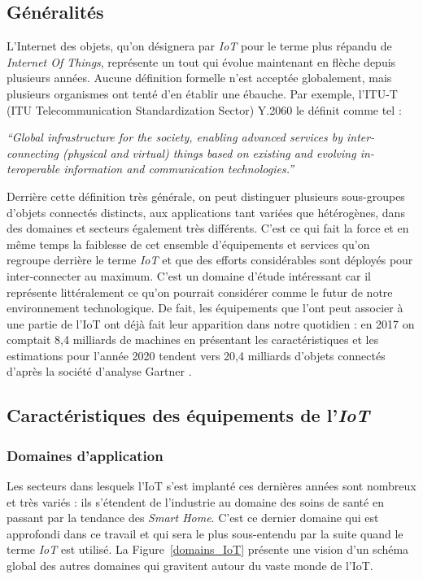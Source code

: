 \documentclass[]{article}
\begin{document}
\subsection{Généralités}

\par L'Internet des objets, qu'on désignera par \textit{IoT} pour le terme plus répandu de \textit{Internet Of Things}, représente un tout qui évolue maintenant en flèche depuis plusieurs années. Aucune définition formelle n'est acceptée globalement, mais plusieurs organismes ont tenté d'en établir une ébauche. Par exemple, l'ITU-T (ITU Telecommunication Standardization Sector) Y.2060 le définit comme tel : 
\begin{center}
\textit{“Global  infrastructure  for  the  society,  enabling  advanced  services  by  inter-connecting (physical and virtual) things based on existing and evolving in-teroperable information and communication technologies.”}
\end{center}

\par Derrière cette définition très générale, on peut distinguer plusieurs sous-groupes d'objets connectés distincts, aux applications tant variées que hétérogènes, dans des domaines et secteurs également très différents. C'est ce qui fait la force et en même temps la faiblesse de cet ensemble d'équipements et services qu'on regroupe derrière le terme \textit{IoT} et que des efforts considérables sont déployés pour inter-connecter au maximum. C'est un domaine d'étude intéressant car il représente littéralement ce qu'on pourrait considérer comme le futur de notre environnement technologique. De fait, les équipements que l'ont peut associer à une partie de l'IoT ont déjà fait leur apparition dans notre quotidien : en 2017 on comptait 8,4 milliards de machines en présentant les caractéristiques et les estimations pour l'année 2020 tendent vers 20,4 milliards d'objets connectés d'après la société d'analyse Gartner \cite{Berte2018}.  
\subsection{Caractéristiques des équipements de l'\textit{IoT}}

\subsubsection{Domaines d'application}

Les secteurs dans lesquels l'IoT s'est implanté ces dernières années sont nombreux et très variés : ils s'étendent de l'industrie au domaine des soins de santé en passant par la tendance des \textit{Smart Home}. C'est ce dernier domaine qui est approfondi dans ce travail et qui sera le plus sous-entendu par la suite quand le terme \textit{IoT} est utilisé. La Figure~\ref{domains_IoT} présente une vision d'un schéma global des autres domaines qui gravitent autour du vaste monde de l'IoT.\\
\end{document}
